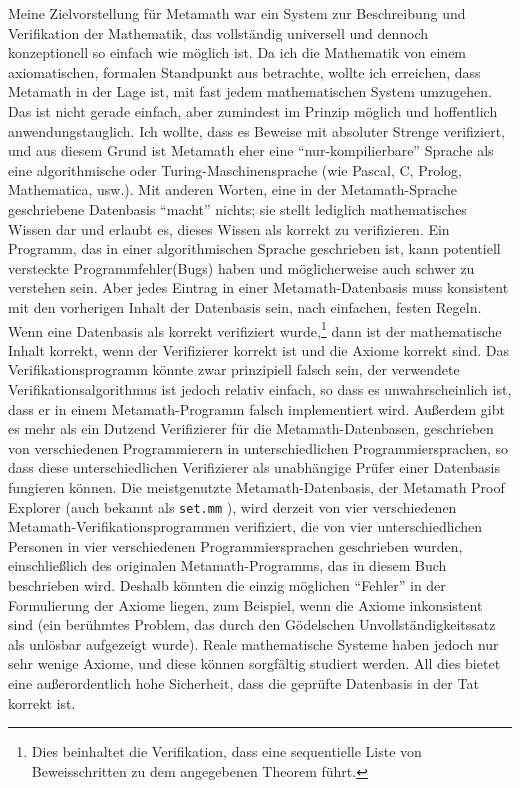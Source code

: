 Meine Zielvorstellung für Metamath war ein System zur Beschreibung und Verifikation der Mathematik, das vollständig universell und dennoch konzeptionell so einfach wie möglich ist. Da ich die Mathematik von einem axiomatischen, formalen Standpunkt aus betrachte, wollte ich erreichen, dass Metamath in der Lage ist, mit fast jedem mathematischen System umzugehen. Das ist nicht gerade einfach, aber zumindest im Prinzip möglich und hoffentlich anwendungstauglich. Ich wollte, dass es Beweise mit absoluter Strenge verifiziert, und aus diesem Grund ist Metamath eher eine "`nur-kompilierbare"' Sprache als eine algorithmische oder Turing-Maschinensprache (wie Pascal, C, Prolog, Mathematica, usw.).  Mit anderen Worten, eine in der Metamath-Sprache geschriebene Datenbasis "`macht"' nichts; sie stellt lediglich mathematisches Wissen dar und erlaubt es, dieses Wissen als korrekt zu verifizieren.  Ein Programm, das in einer algorithmischen Sprache geschrieben ist, kann potentiell versteckte Programmfehler(Bugs) haben und möglicherweise auch schwer zu verstehen sein.  Aber jedes Eintrag in einer Metamath-Datenbasis muss konsistent mit den vorherigen Inhalt der Datenbasis sein, nach einfachen, festen Regeln.
Wenn eine Datenbasis als korrekt verifiziert wurde,\footnote{Dies beinhaltet die Verifikation, dass eine sequentielle Liste von Beweisschritten zu dem angegebenen Theorem führt.} dann ist der mathematische Inhalt korrekt, wenn der Verifizierer korrekt ist und die Axiome korrekt sind.
Das Verifikationsprogramm könnte zwar prinzipiell falsch sein, der verwendete Verifikationsalgorithmus ist jedoch relativ einfach, so dass es unwahrscheinlich ist, dass er in einem Metamath-Programm falsch implementiert wird. Außerdem gibt es mehr als ein Dutzend Verifizierer für die Metamath-Datenbasen, geschrieben von verschiedenen Programmierern in unterschiedlichen Programmiersprachen, so dass diese unterschiedlichen Verifizierer als unabhängige Prüfer einer Datenbasis fungieren können.
Die meistgenutzte Metamath-Datenbasis, der Metamath Proof Explorer (auch bekannt als \texttt{set.mm}%
), wird derzeit von vier verschiedenen Metamath-Verifikationsprogrammen verifiziert, die von vier unterschiedlichen Personen in vier verschiedenen Programmiersprachen geschrieben wurden, einschließlich des originalen Metamath-Programms, das in diesem Buch beschrieben wird.
Deshalb könnten die einzig möglichen "`Fehler"' in der Formulierung der Axiome liegen, zum Beispiel, wenn die Axiome inkonsistent sind (ein berühmtes Problem, das durch den Gödelschen Unvollständigkeitssatz als unlösbar aufgezeigt wurde).
Reale mathematische Systeme haben jedoch nur sehr wenige Axiome, und diese können sorgfältig studiert werden.
All dies bietet eine außerordentlich hohe Sicherheit, dass die geprüfte Datenbasis in der Tat korrekt ist.

